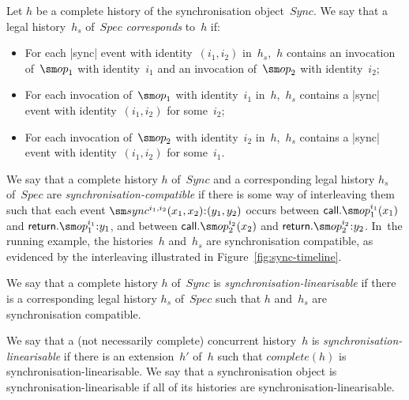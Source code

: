 Let $h$ be a complete history of the synchronisation object~$Sync$.  We say
that a legal history~$h_s$ of~$Spec$ \emph{corresponds} to~$h$ if:
%
\begin{itemize}
\item For each |sync| event with identity~$(i_1,i_2)$ in~$h_s$,\, $h$ contains
  an invocation of~$\op_1$ with identity~$i_1$ and an invocation of~$\op_2$ with
  identity~$i_2$;

\item For each invocation of~$\op_1$ with identity~$i_1$ in~$h$,\, $h_s$
  contains a |sync| event with identity~$(i_1,i_2)$ for some~$i_2$;

\item For each invocation of~$\op_2$ with identity~$i_2$ in~$h$,\, $h_s$
  contains a |sync| event with identity~$(i_1,i_2)$ for some~$i_1$.
\end{itemize}
%

We say that a complete history $h$ of~$Sync$ and a corresponding legal history
$h_s$ of~$Spec$ are \emph{synchronisation-compatible} if there is some way of
interleaving them such that each event $\sync^{i_1, i_2}(x_1, x_2)\:: (y_1,
y_2)$ occurs between $\call.\op_1^{i_1}(x_1)$ and $\return.\op_1^{i_1}\::y_1$,
and between $\call.\op_2^{i_2}(x_2)$ and $\return.\op_2^{i_2}\::y_2$.
%
In~the running example, the histories~$h$ and~$h_s$ are synchronisation
compatible, as evidenced by the interleaving illustrated in
Figure~\ref{fig:sync-timeline}.

We say that a complete history $h$ of~$Sync$ is
\emph{synchronisation-linearisable} if there is a corresponding legal history
$h_s$ of~$Spec$ such that $h$ and~$h_s$ are synchronisation compatible.

We say that a (not necessarily complete) concurrent history~$h$ is
\emph{synchronisation-linearisable} if there is an extension~$h'$ of~$h$ such
that $complete(h)$ is synchronisation-linearisable.  We say that a
synchronisation object is synchronisation-linearisable if all of its histories
are synchronisation-linearisable.


